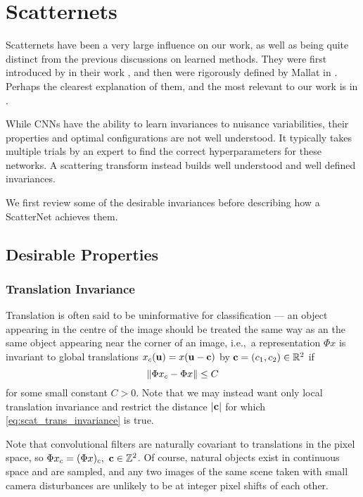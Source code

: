 \section{Scatternets}\label{ch:scatternets}
  Scatternets have been a very large influence on
  our work, as well as being quite distinct from the previous discussions on
  learned methods. They were first introduced by  
  \citeauthor{bruna_classification_2011} in their work 
  \cite{bruna_classification_2011}, and then were rigorously defined by Mallat
  in \cite{mallat_group_2012}. Perhaps the clearest explanation of them, and the most
  relevant to our work is in \cite{bruna_invariant_2013}. 

  While CNNs have the ability to learn invariances to nuisance variabilities, 
  their properties and optimal configurations are not well understood. 
  It typically takes multiple trials
  by an expert to find the correct hyperparameters for these networks. A
  scattering transform instead builds well understood and well defined invariances. 
  
  We first review some of the desirable invariances before describing how a
  ScatterNet achieves them.

\subsection{Desirable Properties}
\subsubsection{Translation Invariance}
  Translation is often said to be uninformative for classification --- an
  object appearing in the centre of the image should be treated the same way as
  an the same object appearing near the corner of an image, i.e.,\ a
  representation $\Phi x$ is invariant to global translations $x_c(\mathbf{u}) =
  x(\mathbf{u}-\mathbf{c})$ by 
  $\mathbf{c}=(c_1,c_2) \in \mathbb{R}^2$ if
  \begin{equation}\label{eq:scat_trans_invariance}
    \left\lVert \Phi x_c - \Phi x \right\rVert \leq C
  \end{equation}
  for some small constant $C>0$.
  Note that we may instead want only local translation invariance and
  restrict the distance $|\mathbf{c}|$ for which \eqref{eq:scat_trans_invariance}
  is true. 
  
  Note that convolutional filters are naturally covariant to translations in the pixel space, 
  so $\Phi x_c = (\Phi x)_c,\ \mathbf{c} \in \mathbb{Z}^2$. Of course, natural objects
  exist in continuous space and are sampled, and any two images of the same
  scene taken with small camera disturbances are unlikely to be at integer pixel 
  shifts of each other.

